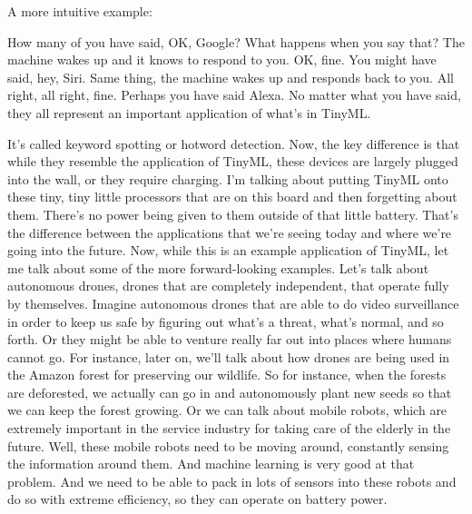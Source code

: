A more intuitive example:

How many of you have said, OK, Google?
What happens when you say that?
The machine wakes up and it knows to respond to you.
OK, fine.
You might have said, hey, Siri.
Same thing, the machine wakes up and responds back to you.
All right, all right, fine.
Perhaps you have said Alexa.
No matter what you have said, they all represent an important application of what's in TinyML.


It's called keyword spotting or hotword detection.
Now, the key difference is that while they resemble the application of TinyML, these devices are largely plugged into the wall, or they require charging.
I'm talking about putting TinyML onto these tiny, tiny little processors that are on this board and then forgetting about them.
There's no power being given to them outside of that little battery.
That's the difference between the applications that we're seeing today and where we're going into the future.
Now, while this is an example application of TinyML, let me talk about some of the more forward-looking examples.
Let's talk about autonomous drones, drones that are completely independent, that operate fully by themselves.
Imagine autonomous drones that are able to do video surveillance in order to keep us safe by figuring out what's a threat, what's normal, and so forth.
Or they might be able to venture really far out into places where humans cannot go.
For instance, later on, we'll talk about how drones are being used in the Amazon forest for preserving our wildlife.
So for instance, when the forests are deforested, we actually can go in and autonomously plant new seeds so that we can keep the forest growing.
Or we can talk about mobile robots, which are extremely important in the service industry for taking care of the elderly in the future.
Well, these mobile robots need to be moving around, constantly sensing the information around them.
And machine learning is very good at that problem.
And we need to be able to pack in lots of sensors into these robots and do so with extreme efficiency, so they can operate on battery power.

